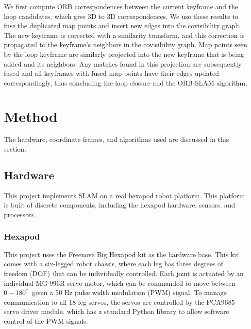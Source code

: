\documentclass[twocolumn]{article}
\begin{document}
We first compute ORB correspondences between the current keyframe and the loop candidates, which give 3D to 3D correspondences. We use these results to fuse the duplicated map points and insert new edges into the covisibility graph. The new keyframe is corrected with a similarity transform, and this correction is propagated to the keyframe's neighbors in the covisibility graph. Map points seen by the loop keyframe are similarly projected into the new keyframe that is being added and its neighbors. Any matches found in this projection are subsequently fused and all keyframes with fused map points have their edges updated correspondingly, thus concluding the loop closure and the ORB-SLAM algorithm.

\section{ Method }

The hardware, coordinate frames, and algorithms used are discussed in this section.

\subsection{ Hardware }

 This project implements SLAM on a real hexapod robot platform. This platform is built of discrete components, including the hexapod hardware, sensors, and processors.

\subsubsection{ Hexapod }

This project uses the Freenove Big Hexapod kit as the hardware base. This kit comes with a six-legged robot chassis, where each leg has three degrees of freedom (DOF) that can be individually controlled. Each joint is actuated by an individual MG-996R servo motor, which can be commanded to move between $0-180^{\degree}$ given a 50 Hz pulse width modulation (PWM) signal. To manage communication to all 18 leg servos, the servos are controlled by the PCA9685 servo driver module, which has a standard Python library to allow software control of the PWM signals.

\end{document}
